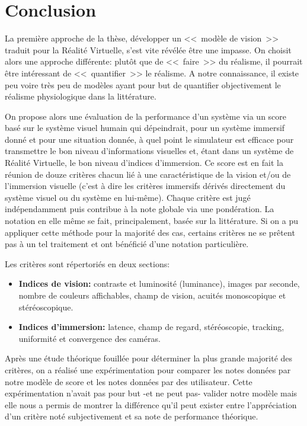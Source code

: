 \chapter*{Conclusion}
\par La première approche de la thèse, développer un <<~modèle de vision~>> traduit pour la Réalité Virtuelle, s'est vite révélée être une impasse. On choisit alors une approche différente: plutôt que de <<~faire~>> du réalisme, il pourrait être intéressant de <<~quantifier~>> le réalisme. A notre connaissance, il existe peu voire très peu de modèles ayant pour but de quantifier objectivement le réalisme physiologique dans la littérature.

\par On propose alors une évaluation de la performance d'un système via un score basé sur le système visuel humain qui dépeindrait, pour un système immersif donné et pour une situation donnée, à quel point le simulateur est efficace pour transmettre le bon niveau d'informations visuelles et, étant dans un système de Réalité Virtuelle, le bon niveau d'indices d'immersion. Ce score est en fait la réunion de douze critères chacun lié à une caractéristique de la vision et/ou de l'immersion visuelle (c'est à dire les critères immersifs dérivés directement du système visuel ou du système en lui-même). Chaque critère est jugé indépendamment puis contribue à la note globale via une pondération. La notation en elle même se fait, principalement, basée sur la littérature. Si on a pu appliquer cette méthode pour la majorité des cas, certains critères ne se prêtent pas à un tel traitement et ont bénéficié d'une notation particulière.

\par Les critères sont répertoriés en deux sections:
	
\begin{itemize}\itemsep12pt
	\item \textbf{Indices de vision:} contraste et luminosité (luminance), images par seconde, nombre de couleurs affichables, champ de vision, acuités monoscopique et stéréoscopique.
	\item \textbf{Indices d'immersion:} latence, champ de regard, stéréoscopie, tracking, uniformité et convergence des caméras.
\end{itemize}
	
\par Après une étude théorique fouillée pour déterminer la plus grande majorité des critères, on a réalisé une expérimentation pour comparer les notes données par notre modèle de score et les notes données par des utilisateur. Cette expérimentation n'avait pas pour but -et ne peut pas- valider notre modèle mais elle nous a permis de montrer la différence qu'il peut exister entre l'appréciation d'un critère noté subjectivement et sa note de performance théorique.

